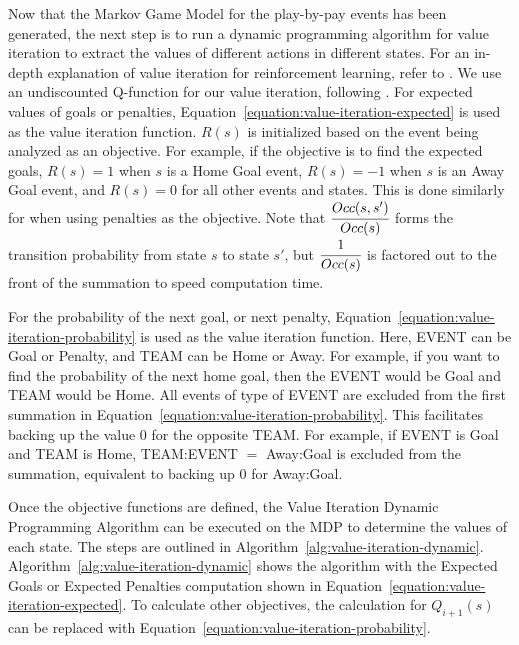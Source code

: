 \documentclass[]{article}
\begin{document}
Now that the Markov Game Model for the play-by-pay events has been generated, the next step is to run a dynamic programming algorithm for value iteration to extract the values of different actions in different states. For an in-depth explanation of value iteration for reinforcement learning, refer to \citep{Mitchell1997}. We use an undiscounted Q-function for our value iteration, following \citep{Schwartz1993}. For expected values of goals or penalties, Equation~\ref{equation:value-iteration-expected} is used as the value iteration function. $R(s)$ is initialized based on the event being analyzed as an objective. For example, if the objective is to find the expected goals, $R(s) = 1$ when $s$ is a Home Goal event, $R(s) = -1$ when $s$ is an Away Goal event, and $R(s) = 0$ for all other events and states. This is done similarly for when using penalties as the objective. Note that $\cfrac{Occ(s,s')}{Occ(s)}$ forms the transition probability from state $s$ to state $s'$, but $\cfrac{1}{Occ(s)}$ is factored out to the front of the summation to speed computation time.

For the probability of the next goal, or next penalty, Equation~\ref{equation:value-iteration-probability} is used as the value iteration function. Here, EVENT can be Goal or Penalty, and TEAM can be Home or Away. For example, if you want to find the probability of the next home goal, then the EVENT would be Goal and TEAM would be Home. All events of type of EVENT are excluded from the first summation in Equation~\ref{equation:value-iteration-probability}. This facilitates backing up the value $0$ for the opposite TEAM. For example, if EVENT is Goal and TEAM is Home, TEAM:EVENT $=$ Away:Goal is excluded from the summation, equivalent to backing up $0$ for Away:Goal.


Once the objective functions are defined, the Value Iteration Dynamic Programming Algorithm can be executed on the MDP to determine the values of each state. The steps are outlined in Algorithm~\ref{alg:value-iteration-dynamic}. Algorithm~\ref{alg:value-iteration-dynamic} shows the algorithm with the Expected Goals or Expected Penalties computation shown in Equation~\ref{equation:value-iteration-expected}. To calculate other objectives, the calculation for $Q_{i+1}(s)$ can be replaced with Equation~\ref{equation:value-iteration-probability}.%
\end{document}
